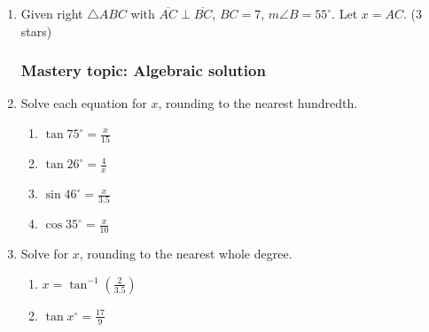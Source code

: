 \documentclass[12pt, twoside]{article}
\begin{document}
\begin{enumerate}
\item Given right $\triangle ABC$ with $\overline{AC} \perp \overline{BC}$, $BC=7$, $m\angle B=55^\circ$. Let $x=AC$. \hfill (3 stars)
  \begin{flushright}
  \end{flushright}

\newpage
\subsubsection*{Mastery topic: Algebraic solution}
\item Solve each equation for $x$, rounding to the nearest hundredth.
  \begin{multicols}{2}
  \begin{enumerate}
  \item $\displaystyle \tan 75^\circ = \frac{x}{15}$ \vspace{5cm}
  \item $\displaystyle \tan 26^\circ = \frac{4}{x}$
  \item $\displaystyle \sin 46^\circ  = \frac{x}{3.5}$ \vspace{5cm}
  \item $\displaystyle \cos 35^\circ = \frac{x}{10}$
  \end{enumerate}
  \end{multicols}
  \vspace{6cm}

\item Solve for $x$, rounding to the nearest whole degree.
  \begin{multicols}{2}
  \begin{enumerate}
  \item $\displaystyle x = \tan^{-1} (\frac{2}{3.5})$ \vspace{4cm}
  \item $\displaystyle \tan x^\circ = \frac{17}{9}$ \vspace{4cm}
  \end{enumerate}
  \end{multicols}

\end{enumerate}
\end{document}
